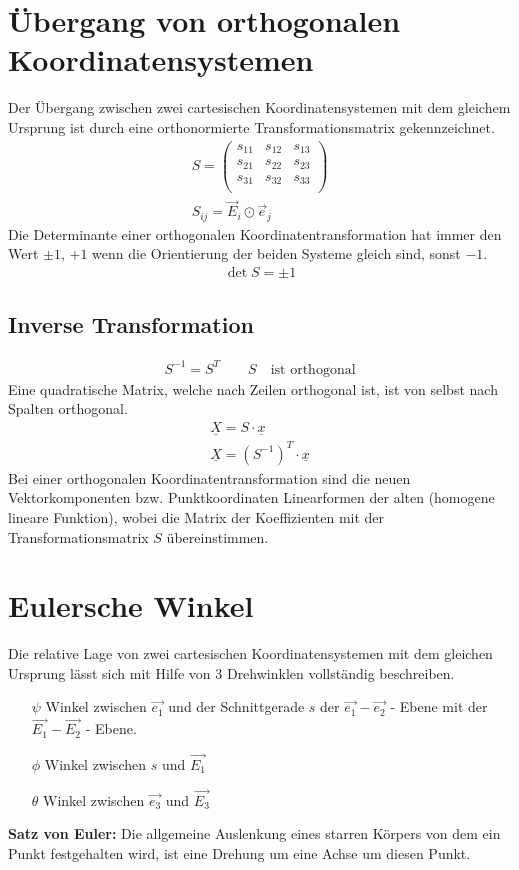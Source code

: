 \section{\"Ubergang von orthogonalen Koordinatensystemen}
Der \"Ubergang zwischen zwei cartesischen Koordinatensystemen mit dem gleichem
Ursprung ist durch eine orthonormierte Transformationsmatrix gekennzeichnet.
\begin{gather}
  S = \begin{pmatrix}
		s_{11} & s_{12} & s_{13} \\
		s_{21} & s_{22} & s_{23} \\
		s_{31} & s_{32} & s_{33} \\
	\end{pmatrix} \\
  S_{ij} = \overrightarrow{E}_i \odot \overrightarrow{e}_j
\end{gather}
Die Determinante einer orthogonalen Koordinatentransformation hat immer den Wert $\pm 1$, $+1$ wenn die Orientierung der beiden Systeme gleich sind, sonst $-1$.
\begin{gather}
  \det{S} = \pm 1
\end{gather}

\subsection{Inverse Transformation}
\begin{gather}
  S^{-1} = S^T \qquad S\quad\text{ist orthogonal}
\end{gather}
Eine quadratische Matrix, welche nach Zeilen orthogonal ist, ist von selbst nach
Spalten orthogonal.
\begin{gather}
  \underline{X} = S\cdot\underline{x} \\
  \underline{X} = (S^{-1})^T\cdot\underline{x}
\end{gather}
Bei einer orthogonalen Koordinatentransformation sind die neuen Vektorkomponenten bzw. Punktkoordinaten Linearformen der alten (homogene lineare Funktion), wobei die Matrix der Koeffizienten mit der Transformationsmatrix $S$ \"ubereinstimmen.


\section{Eulersche Winkel}
Die relative Lage von zwei cartesischen Koordinatensystemen mit dem
gleichen Ursprung l\"asst sich mit Hilfe von 3 Drehwinklen vollst\"andig beschreiben.
\begin{itemize}
  \item[$\psi$] Winkel zwischen $\overrightarrow{e_1}$ und der Schnittgerade $s$ der $\overrightarrow{e_1}-\overrightarrow{e_2}$ - Ebene mit der $\overrightarrow{E_1}-\overrightarrow{E_2}$ - Ebene.
  \item[$\phi$] Winkel zwischen $s$ und $\overrightarrow{E_1}$
  \item[$\theta$] Winkel zwischen $\overrightarrow{e_3}$ und $\overrightarrow{E_3}$
\end{itemize}
\textbf{Satz von Euler:} Die allgemeine Auslenkung eines starren K\"orpers von dem ein Punkt festgehalten wird, ist eine Drehung um eine Achse um diesen Punkt.

